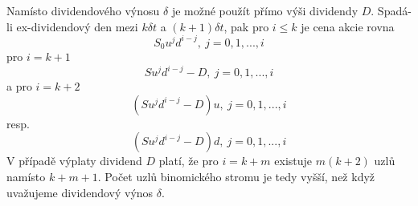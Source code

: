\documentclass[a4paper]{book}
\begin{document}
Namísto dividendového výnosu $\delta$ je možné použít přímo výši dividendy $D$. Spadá-li ex-dividendový den mezi $k \delta t$ a $(k+1) \delta t$, pak pro $i \le k$ je cena akcie rovna
\begin{equation*}
S_0 u^j d^{i-j},~j=0, 1, ..., i
\end{equation*}
pro $i=k+1$ 
\begin{equation*}
Su^jd^{i-j}-D,~j=0, 1, ..., i
\end{equation*} 
a pro $i=k+2$
\begin{equation*}
(Su^jd^{i-j}-D)u,~j=0, 1, ..., i
\end{equation*}
resp.
\begin{equation*}
(Su^jd^{i-j}-D)d,~j=0, 1, ..., i
\end{equation*}
V případě výplaty dividend $D$ platí, že pro $i=k+m$ existuje $m(k+2)$ uzlů namísto $k+m+1$. Počet uzlů binomického stromu je tedy vyšší, než když uvažujeme dividendový výnos $\delta$.
\end{document}

